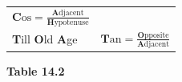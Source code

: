 {{\begin{center}
\begin{xtabular}[t]{|l|l|}
                  \begin{math}\mathbf{C}\mathrm{os}=\frac{\mathbf{A}\mathrm{djacent}}{\mathbf{H}\mathrm{ypotenuse}}\end{math}
     \tabularnewline{}
        \textbf{T}ill \textbf{O}ld \textbf{A}ge &
                  \begin{math}\mathbf{T}\mathrm{an}=\frac{\mathbf{O}\mathrm{pposite}}{\mathbf{A}\mathrm{djacent}}\end{math}
     \tabularnewline{}
    \end{xtabular}
      \end{center}
    \begin{center}{\small\bfseries Table 14.2}\end{center}
          } %
        }{%
        }

